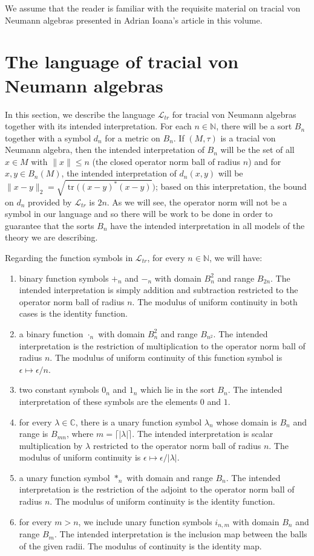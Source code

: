 \documentclass[12pt]{amsart}
\theoremstyle{definition}
\def\cal{\mathcal}
\DeclareMathOperator{\tr}{tr}
\newcommand\cL{{\cal L}}
\newcommand\bN{{\mathbb N}}
\newcommand\bC{{\mathbb C}}
\begin{document}
We assume that the reader is familiar with the requisite material on tracial von Neumann algebras presented in Adrian Ioana's article in this volume.

\section{The language of tracial von Neumann algebras}


In this section, we describe the language $\cL_{tr}$ for tracial von Neumann algebras together with its intended interpretation. For each $n \in \bN$, there will be a sort $B_n$ together with a symbol $d_n$ for a metric on $B_n$.  If $(M,\tau)$ is a tracial von Neumann algebra, then the intended interpretation of $B_n$ will be the set of all $x \in M$ with $\|x\| \leq n$ (the closed operator norm ball of radius $n$) and for $x,y \in B_n(M)$, the intended interpretation of $d_n(x,y)$ will be $\|x-y\|_2=\sqrt{\tr((x-y)^*(x-y)})$; based on this interpretation, the bound on $d_n$ provided by $\cL_{tr}$ is $2n$.  As we will see, the operator norm will not be a symbol in our language and so there will be work to be done in order to guarantee that the sorts $B_n$ have the intended interpretation in all models of the theory we are describing.  

Regarding the function symbols in $\cL_{tr}$, for every $n \in \bN$, we will have: 
\begin{enumerate}
    \item binary function symbols $+_n$ and $-_n$ with domain $B_n^2$ and range $B_{2n}$.  The intended interpretation is simply addition and subtraction restricted to the operator norm ball of radius $n$.  The modulus of uniform continuity in both cases is the identity function.
    \item a binary function $\cdot_n$ with domain $B_n^2$ and range $B_{n^2}$.  The intended interpretation is the restriction of multiplication to the operator norm ball of radius $n$.  The modulus of uniform continuity of this function symbol is $\epsilon \mapsto \epsilon/n$.
    \item two constant symbols $0_n$ and $1_n$ which lie in the sort $B_n$.  The intended interpretation of these symbols are the elements $0$ and $1$.
    \item for every $\lambda \in \bC$, there is a unary function symbol $\lambda_n$ whose domain is $B_n$ and range is $B_{mn}$, where $m = \lceil{|\lambda|}\rceil$.  The intended interpretation is scalar multiplication by $\lambda$ restricted to the operator norm ball of radius $n$.  The modulus of uniform continuity is $\epsilon \mapsto \epsilon/|\lambda|$.
    \item a unary function symbol $\ast_n$ with domain and range $B_n$.  The intended interpretation is the restriction of the adjoint to the operator norm ball of radius $n$.  The modulus of uniform continuity is the identity function.
    \item for every $m > n$, we include unary function symbols $i_{n,m}$ with domain $B_n$ and range $B_m$.  The intended interpretation is the inclusion map between the balls of the given radii.  The modulus of continuity is the identity map.
\end{enumerate} 
\end{document}
